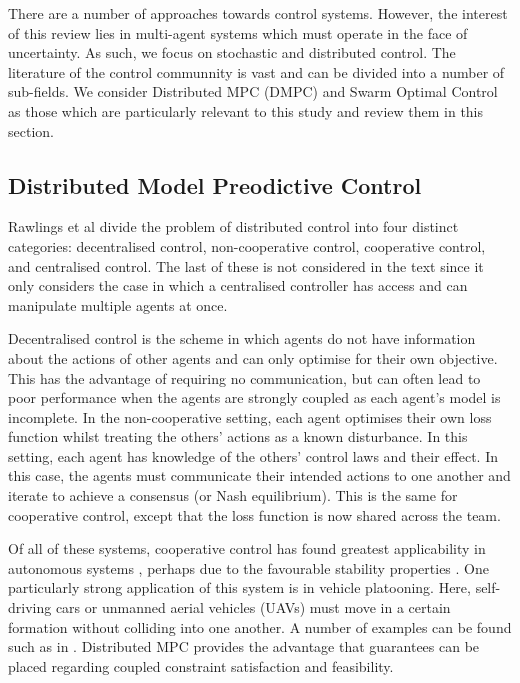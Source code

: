 \documentclass[.../main.tex]{subfiles}
\begin{document}
There are a number of approaches towards control systems. However, the interest of this review lies
in multi-agent systems which must operate in the face of uncertainty. As such, we focus on
stochastic and distributed control. The literature of the control communnity is vast and can be
divided into a number of sub-fields. We consider Distributed MPC (DMPC) and Swarm Optimal Control as
those which are particularly relevant to this study and review them in this section.

\subsection{Distributed Model Preodictive Control} \label{sec::Distributed_MPC}

Rawlings et al \cite{rawlings2017model} divide the problem of distributed control into four distinct
categories: decentralised control, non-cooperative control, cooperative control, and centralised
control. The last of these is not considered in the text since it only considers the case in which a
centralised controller has access and can manipulate multiple agents at once. 

Decentralised control is the scheme in which agents do not have information about the actions of
other agents and can only optimise for their own objective. This has the advantage of requiring no
communication, but can often lead to poor performance when the agents are strongly coupled as each
agent’s model is incomplete. In the non-cooperative setting, each agent optimises their own loss
function whilst treating the others’ actions as a known disturbance. In this setting, each agent has
knowledge of the others’ control laws and their effect. In this case, the agents must communicate
their intended actions to one another and iterate to achieve a consensus (or Nash equilibrium). This
is the same for cooperative control, except that the loss function is now shared across the team. 

Of all of these systems, cooperative control has found greatest applicability in autonomous systems
\cite{Negenborn2014}, perhaps due to the favourable stability properties \cite{Venkat2006}. One
particularly strong application of this system is in vehicle platooning. Here, self-driving cars or
unmanned aerial vehicles (UAVs) must move in a certain formation without colliding into one another.
A number of examples can be found such as in \cite{Liu2019, VanParys2017, Zheng2017}. Distributed
MPC provides the advantage that guarantees can be placed regarding coupled constraint satisfaction
and feasibility.
\end{document}
